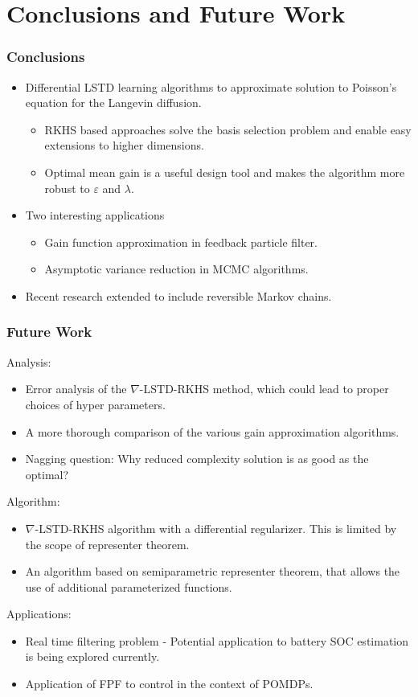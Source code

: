\documentclass[xcolor=dvipsnames, subsection=false]{beamer}
\def\alertb#1{\alert{\color{BrickRed}  #1}}
\def\alertb#1{\alert{\color{BrickRed}  #1}}
\def\epsy{\varepsilon}
\def\gradTD{\nabla\text{-LSTD}}
\begin{document}
\section{Conclusions and Future Work}
\begin{frame}
\frametitle{Conclusions}
\begin{itemize}
	\item Differential LSTD learning algorithms to approximate solution to Poisson's equation for the Langevin diffusion.\\[-0.1cm]
	 \begin{itemize}
	 	\item RKHS based approaches solve the basis selection problem and enable easy extensions to higher dimensions.
	 	\item Optimal mean gain is a useful design tool and makes the algorithm more robust to $\epsy$ and $\lambda$. 
	 \end{itemize}
	\item Two interesting applications
	\begin{itemize}
		\item Gain function approximation in feedback particle filter.
		\item Asymptotic variance reduction in MCMC algorithms.
	\end{itemize}
	\item Recent research extended to include reversible Markov chains.
\end{itemize}
\end{frame}

\begin{frame}
\frametitle{Future Work}
\alertb{Analysis}:
	\begin{itemize}
		\item Error analysis of the $\gradTD$-RKHS method, which could lead to proper choices of hyper parameters.
		\item A more thorough comparison of the various gain approximation algorithms.
		\item \alertb{Nagging question:} Why reduced complexity solution is as good as the optimal?
	\end{itemize} \pause
	\alertb{Algorithm}:
	\begin{itemize}
		\item $\gradTD$-RKHS algorithm with a differential regularizer. This is limited by the scope of representer theorem. 
		\item An algorithm based on semiparametric representer theorem, that allows the use of additional parameterized functions.
	\end{itemize} \pause
	\alertb{Applications}:
	\begin{itemize}
		\item  Real time filtering problem - Potential application to battery SOC estimation is being explored currently. 
		\item Application of FPF to control in the context of POMDPs.
\end{itemize}
\end{frame}
\end{document}
